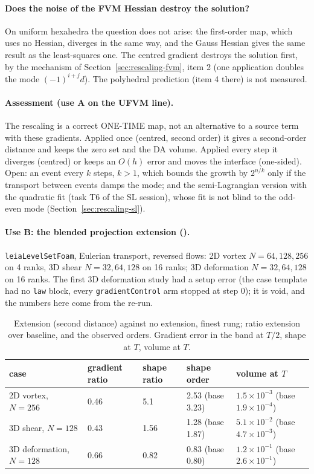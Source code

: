 \paragraph{Does the noise of the FVM Hessian destroy the solution?} On uniform hexahedra the
question does not arise: the first-order map, which uses no Hessian, diverges in the same way, and
the Gauss Hessian gives the same result as the least-squares one. The centred gradient destroys
the solution first, by the mechanism of Section~\ref{sec:rescaling-fvm}, item 2 (one application
doubles the mode $(-1)^{i+j}d$). The polyhedral prediction (item 4 there) is not measured.

\paragraph{Assessment (use A on the UFVM line).} The rescaling is a correct ONE-TIME map, not an
alternative to a source term with these gradients. Applied once (centred, second order) it gives a
second-order distance and keeps the zero set and the DA volume. Applied every step it diverges
(centred) or keeps an $O(h)$ error and moves the interface (one-sided). Open: an event every $k$
steps, $k>1$, which bounds the growth by $2^{n/k}$ only if the transport between events damps the
mode; and the semi-Lagrangian version with the quadratic fit (task T6 of the SL session), whose
fit is not blind to the odd-even mode (Section~\ref{sec:rescaling-sl}).

\paragraph{Use B: the blended projection extension (\Meas).} \texttt{leiaLevelSetFoam}, Eulerian
transport, reversed flows: 2D vortex $N=64,128,256$ on 4 ranks, 3D shear $N=32,64,128$ on 16
ranks; 3D deformation $N=32,64,128$ on 16 ranks. The first 3D deformation study had a setup
error (the case template had no \texttt{law} block, every \texttt{gradientControl} arm stopped at
step 0); it is void, and the numbers here come from the re-run.

\begin{table}[h]\centering\small
\caption{Extension (second distance) against no extension, finest rung; ratio extension over
baseline, and the observed orders. Gradient error in the band at $T/2$, shape at $T$, volume at
$T$. \Meas}
\label{tab:pb}
\begin{tabular}{lllll}
\toprule
case & gradient ratio & shape ratio & shape order & volume at $T$ \\
\midrule
2D vortex, $N=256$ & 0.46 & 5.1 & 2.53 (base 3.23) & $1.5\times10^{-3}$ (base $1.9\times10^{-4}$) \\
3D shear, $N=128$ & 0.43 & 1.56 & 1.28 (base 1.87) & $5.1\times10^{-2}$ (base $4.7\times10^{-3}$) \\
3D deformation, $N=128$ & 0.66 & 0.82 & 0.83 (base 0.80) & $1.2\times10^{-1}$ (base $2.6\times10^{-1}$) \\
\bottomrule
\end{tabular}
\end{table}

